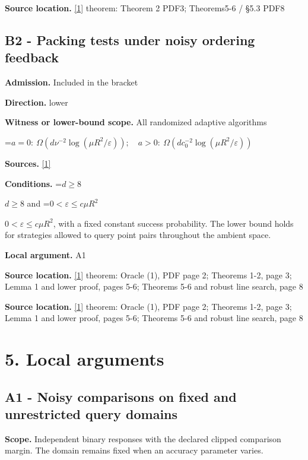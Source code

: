 \documentclass[10pt,a4paper]{article}
\newcommand{\AtlasMath}[1]{\par\begingroup\centering\setbox0=\hbox{$\displaystyle #1$}\ifdim\wd0>1.4\linewidth\typeout{ATLAS WIDE FORMULA: \the\wd0}\fi\ifdim\wd0>\linewidth\resizebox{\linewidth}{!}{\box0}\else\box0\fi\par\endgroup}
\newcommand{\AtlasInlineMath}[1]{\begingroup\setbox0=\hbox{$#1$}\ifdim\wd0>.4\linewidth\endgroup\AtlasMath{#1}\else\endgroup$#1$\fi}
\begin{document}
\textbf{Source location.} \href{https://papers.nips.cc/paper_files/paper/2012/file/e6d8545daa42d5ced125a4bf747b3688-Paper.pdf}{[1]} theorem: Theorem 2 PDF3; Theorems5-6 / §5.3 PDF8

\subsection{B2 - Packing tests under noisy ordering feedback}
\textbf{Admission.} Included in the bracket

\textbf{Direction.} lower

\textbf{Witness or lower-bound scope.} All randomized adaptive algorithms

\AtlasMath{a=0:\ \Omega\!\left(d\nu^{-2}\log(\mu R^2/\varepsilon)\right);\quad a>0:\ \Omega\!\left(dc_0^{-2}\log(\mu R^2/\varepsilon)\right)}
\textbf{Sources.} \href{https://papers.nips.cc/paper_files/paper/2012/file/e6d8545daa42d5ced125a4bf747b3688-Paper.pdf}{[1]}

\textbf{Conditions.} \AtlasInlineMath{d\ge8} and \AtlasInlineMath{0<\varepsilon\le c\mu R^2}, with a fixed constant success probability. The lower bound holds for strategies allowed to query point pairs throughout the ambient space.

\textbf{Local argument.} A1

\textbf{Source location.} \href{https://papers.nips.cc/paper_files/paper/2012/file/e6d8545daa42d5ced125a4bf747b3688-Paper.pdf}{[1]} theorem: Oracle (1), PDF page 2; Theorems 1-2, page 3; Lemma 1 and lower proof, pages 5-6; Theorems 5-6 and robust line search, page 8

\textbf{Source location.} \href{https://papers.nips.cc/paper_files/paper/2012/file/e6d8545daa42d5ced125a4bf747b3688-Paper.pdf}{[1]} theorem: Oracle (1), PDF page 2; Theorems 1-2, page 3; Lemma 1 and lower proof, pages 5-6; Theorems 5-6 and robust line search, page 8

\section{5. Local arguments}
\subsection{A1 - Noisy comparisons on fixed and unrestricted query domains}
\textbf{Scope.} Independent binary responses with the declared clipped comparison margin. The domain remains fixed when an accuracy parameter varies.
\end{document}
